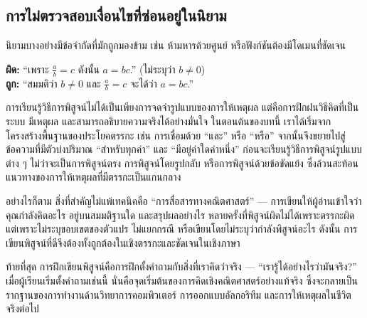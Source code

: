 \subsection*{การไม่ตรวจสอบเงื่อนไขที่ซ่อนอยู่ในนิยาม}
นิยามบางอย่างมีข้อจำกัดที่มักถูกมองข้าม เช่น ห้ามหารด้วยศูนย์ หรือฟังก์ชันต้องมีโดเมนที่ชัดเจน  
\begin{exam}
	\textbf{ผิด:} “เพราะ $\frac{a}{b}=c$ ดังนั้น $a=bc$.” (ไม่ระบุว่า $b \neq 0$)\\
	\textbf{ถูก:} “สมมติว่า $b \neq 0$ และ $\frac{a}{b}=c$ จะได้ว่า $a=bc$.”
\end{exam}

การเรียนรู้วิธีการพิสูจน์ไม่ได้เป็นเพียงการจดจำรูปแบบของการให้เหตุผล แต่คือการฝึกฝนวิธีคิดที่เป็นระบบ มีเหตุผล และสามารถอธิบายความจริงได้อย่างมั่นใจ ในตอนต้นของบทนี้ เราได้เริ่มจากโครงสร้างพื้นฐานของประโยคตรรกะ เช่น การเชื่อมด้วย “และ” หรือ “หรือ” จากนั้นจึงขยายไปสู่ข้อความที่มีตัวบ่งปริมาณ “สำหรับทุกค่า” และ “มีอยู่ค่าใดค่าหนึ่ง” ก่อนจะเรียนรู้วิธีการพิสูจน์รูปแบบต่าง ๆ ไม่ว่าจะเป็นการพิสูจน์ตรง การพิสูจน์โดยรูปกลับ หรือการพิสูจน์ด้วยข้อขัดแย้ง ซึ่งล้วนสะท้อนแนวทางของการให้เหตุผลที่มีตรรกะเป็นแกนกลาง

อย่างไรก็ตาม สิ่งที่สำคัญไม่แพ้เทคนิคคือ “การสื่อสารทางคณิตศาสตร์” — การเขียนให้ผู้อ่านเข้าใจว่าคุณกำลังคิดอะไร อยู่บนสมมติฐานใด และสรุปผลอย่างไร หลายครั้งที่พิสูจน์ผิดไม่ได้เพราะตรรกะผิด แต่เพราะไม่ระบุขอบเขตของตัวแปร ไม่แยกกรณี หรือเขียนโดยไม่ระบุว่ากำลังพิสูจน์อะไร ดังนั้น การเขียนพิสูจน์ที่ดีจึงต้องทั้งถูกต้องในเชิงตรรกะและชัดเจนในเชิงภาษา

ท้ายที่สุด การฝึกเขียนพิสูจน์คือการฝึกตั้งคำถามกับสิ่งที่เราคิดว่าจริง — “เรารู้ได้อย่างไรว่ามันจริง?” เมื่อผู้เรียนเริ่มตั้งคำถามเช่นนี้ นั่นคือจุดเริ่มต้นของการคิดเชิงคณิตศาสตร์อย่างแท้จริง ซึ่งจะกลายเป็นรากฐานของการทำงานด้านวิทยาการคอมพิวเตอร์ การออกแบบอัลกอริทึม และการให้เหตุผลในชีวิตจริงต่อไป















